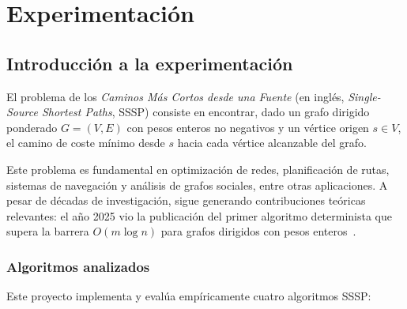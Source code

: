 
\section{Experimentación}

\subsection{Introducción a la experimentación}

El problema de los \textit{Caminos Más Cortos desde una Fuente} (en inglés,
\textit{Single-Source Shortest Paths}, SSSP) consiste en encontrar, dado un
grafo dirigido ponderado $G = (V, E)$ con pesos enteros no negativos y un
vértice origen $s \in V$, el camino de coste mínimo desde $s$ hacia cada
vértice alcanzable del grafo.

Este problema es fundamental en optimización de redes, planificación de rutas,
sistemas de navegación y análisis de grafos sociales, entre otras
aplicaciones. A pesar de décadas de investigación, sigue generando
contribuciones teóricas relevantes: el año 2025 vio la publicación del primer
algoritmo determinista que supera la barrera $O(m \log n)$ para grafos
dirigidos con pesos enteros~\cite{duan2025}.

\subsubsection*{Algoritmos analizados}

Este proyecto implementa y evalúa empíricamente cuatro algoritmos SSSP:

